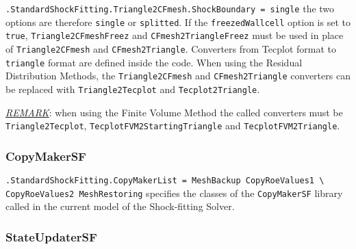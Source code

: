 \documentclass[11pt,a4paper,oneside]{article}
\begin{document}
\newline
\newline
\hspace*{1cm} \texttt{.StandardShockFitting.Triangle2CFmesh.ShockBoundary = single}
\newline
\newline
the two options are therefore \texttt{single} or \texttt{splitted}.
\newline
If the \texttt{freezedWallcell} option is set to \texttt{true}, \texttt{Triangle2CFmeshFreez} and \texttt{CFmesh2TriangleFreez} must be used in place of \texttt{Triangle2CFmesh} and \texttt{CFmesh2Triangle}.
\newline
\newline
Converters from Tecplot format to \texttt{triangle} format are defined inside the code. When using the Residual Distribution Methods, the \texttt{Triangle2CFmesh} and \texttt{CFmesh2Triangle} converters can be replaced with \texttt{Triangle2Tecplot} and \texttt{Tecplot2Triangle}.
\newline

\underline{\emph{REMARK}}: when using the Finite Volume Method the called converters must be \texttt{Triangle2Tecplot}, \texttt{TecplotFVM2StartingTriangle} and \texttt{TecplotFVM2Triangle}.

\subsubsection*{CopyMakerSF}

\hspace*{1cm} \texttt{.StandardShockFitting.CopyMakerList = MeshBackup CopyRoeValues1 \textbackslash{}}
\newline
\hspace*{8.6cm} \texttt{CopyRoeValues2 MeshRestoring}
\newline
\newline
specifies the classes of the \texttt{CopyMakerSF} library called in the current model of the Shock-fitting Solver.

\subsubsection*{StateUpdaterSF}
\label{subsubsec:state updater}
\end{document}
